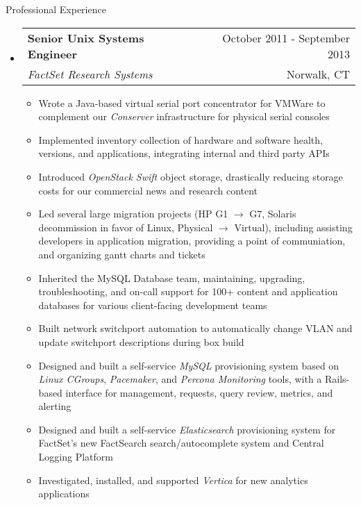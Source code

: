 \documentclass[letterpaper,10pt]{article}
\makeatletter
\newenvironment{ressection}[1]{
	\vspace{4pt}
	{\fontfamily{phv}\selectfont\Large#1}
	\begin{itemize}
	\vspace{3pt}
}{
	\end{itemize}
}
\newcommand{\ressubitem}[1]{
	\vspace{-1pt}
	\item \begin{flushleft} #1 \end{flushleft}
}
\newcommand{\resbigitem}[4]{
	\vspace{-5pt}
	\item
	\begin{tabular*}{6in}{l@{\extracolsep{\fill}}r}
		\textbf{#1} & #2 \\
		\textit{#3} & #4\\
	\end{tabular*}
}
\newenvironment{ressubsec}[4]{
	\resbigitem{#1}{#2}{#3}{#4}
	\vspace{-2pt}
	\begin{itemize}
}{
	\end{itemize}
}
\makeatother
\begin{document}
\begin{ressection}{Professional Experience}
	\begin{ressubsec}{Senior Unix Systems Engineer}{October 2011 - September 2013}{FactSet Research Systems}{Norwalk, CT}
		\ressubitem{Wrote a Java-based virtual serial port concentrator for VMWare to complement our \textit{Conserver} infrastructure for physical serial consoles}
		\ressubitem{Implemented inventory collection of hardware and software health, versions, and applications, integrating internal and third party APIs}
		\ressubitem{Introduced \textit{OpenStack Swift} object storage, drastically reducing storage costs for our commercial news and research content}
		\ressubitem{Led several large migration projects (HP G1 $\rightarrow$ G7, Solaris decommission in favor of Linux, Physical $\rightarrow$ Virtual), including assisting developers in application migration, providing a point of communiation, and organizing gantt charts and tickets}
		\ressubitem{Inherited the MySQL Database team, maintaining, upgrading, troubleshooting, and on-call support for 100+ content and application databases for various client-facing development teams}
		\ressubitem{Built network switchport automation to automatically change VLAN and update switchport descriptions during box build}
		\ressubitem{Designed and built a self-service \textit{MySQL} provisioning system based on \textit{Linux CGroups}, \textit{Pacemaker}, and \textit{Percona Monitoring} tools, with a Rails-based interface for management, requests, query review, metrics, and alerting}
		\ressubitem{Designed and built a self-service \textit{Elasticsearch} provisioning system for FactSet's new FactSearch search/autocomplete system and Central Logging Platform}
		\ressubitem{Investigated, installed, and supported \textit{Vertica} for new analytics applications}
	\end{ressubsec}


\end{ressection}
\end{document}
